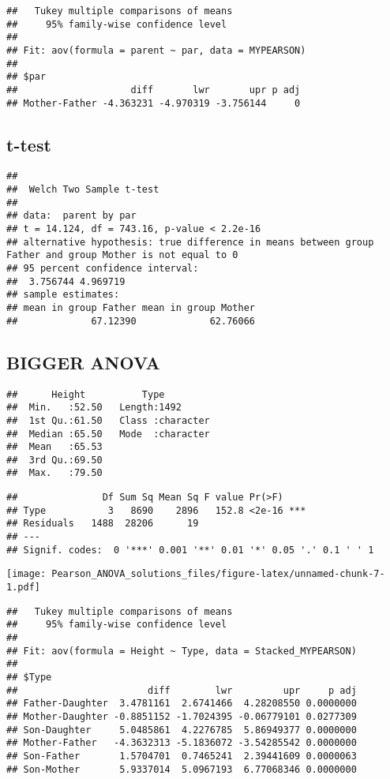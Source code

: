 \documentclass[
]{article}
\begin{document}
\begin{verbatim}
##   Tukey multiple comparisons of means
##     95% family-wise confidence level
## 
## Fit: aov(formula = parent ~ par, data = MYPEARSON)
## 
## $par
##                    diff       lwr       upr p adj
## Mother-Father -4.363231 -4.970319 -3.756144     0
\end{verbatim}

\hypertarget{t-test}{%
\subsection{t-test}\label{t-test}}

\begin{verbatim}
## 
##  Welch Two Sample t-test
## 
## data:  parent by par
## t = 14.124, df = 743.16, p-value < 2.2e-16
## alternative hypothesis: true difference in means between group Father and group Mother is not equal to 0
## 95 percent confidence interval:
##  3.756744 4.969719
## sample estimates:
## mean in group Father mean in group Mother 
##             67.12390             62.76066
\end{verbatim}

\hypertarget{bigger-anova}{%
\subsection{BIGGER ANOVA}\label{bigger-anova}}

\begin{verbatim}
##      Height          Type          
##  Min.   :52.50   Length:1492       
##  1st Qu.:61.50   Class :character  
##  Median :65.50   Mode  :character  
##  Mean   :65.53                     
##  3rd Qu.:69.50                     
##  Max.   :79.50
\end{verbatim}

\begin{verbatim}
##               Df Sum Sq Mean Sq F value Pr(>F)    
## Type           3   8690    2896   152.8 <2e-16 ***
## Residuals   1488  28206      19                   
## ---
## Signif. codes:  0 '***' 0.001 '**' 0.01 '*' 0.05 '.' 0.1 ' ' 1
\end{verbatim}

\texttt{[image: Pearson\_ANOVA\_solutions\_files/figure-latex/unnamed-chunk-7-1.pdf]}

\begin{verbatim}
##   Tukey multiple comparisons of means
##     95% family-wise confidence level
## 
## Fit: aov(formula = Height ~ Type, data = Stacked_MYPEARSON)
## 
## $Type
##                       diff        lwr         upr     p adj
## Father-Daughter  3.4781161  2.6741466  4.28208550 0.0000000
## Mother-Daughter -0.8851152 -1.7024395 -0.06779101 0.0277309
## Son-Daughter     5.0485861  4.2276785  5.86949377 0.0000000
## Mother-Father   -4.3632313 -5.1836072 -3.54285542 0.0000000
## Son-Father       1.5704701  0.7465241  2.39441609 0.0000063
## Son-Mother       5.9337014  5.0967193  6.77068346 0.0000000
\end{verbatim}
\end{document}
